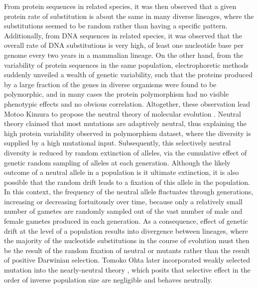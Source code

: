 From protein sequences in related species, it was then observed that a given protein rate of substitution is about the same in many diverse lineages, where the substitutions seemed to be random rather than having a specific pattern.
Additionally, from DNA sequences in related species, it was observed that the overall rate of DNA substitutions is very high, of least one nucleotide base per genome every two years in a mammalian lineage.
On the other hand, from the variability of protein sequences in the same population, electrophoretic methods suddenly unveiled a wealth of genetic variability, such that the proteins produced by a large fraction of the genes in diverse organisms were found to be polymorphic, and in many cases the protein polymorphism had no visible phenotypic effects and no obvious correlation.
Altogether, these observation lead Motoo Kimura to propose the \gls{neutral} theory of molecular evolution \citep{kimura1968evolutionary,kimura1991neutral,kimura1986dna}.
Neutral theory claimed that most mutations are adaptively \gls{neutral}, thus explaining the high protein variability observed in polymorphism dataset, where the diversity is supplied by a high mutational input.
Subsequently, this selectively neutral diversity is reduced by random extinction of alleles, via the cumulative effect of genetic random sampling of alleles at each generation.
Although the likely outcome of a neutral allele in a population is it ultimate extinction, it is also possible that the random drift leads to a fixation of this allele in the population.
In this context, the frequency of the neutral allele fluctuates through generations, increasing or decreasing fortuitously over time, because only a relatively small number of gametes are randomly sampled out of the vast number of male and female gametes produced in each generation.
As a consequence, effect of genetic drift at the level of a population results into divergence between lineages, where the majority of the nucleotide substitutions in the course of evolution must then be the result of the random fixation of neutral or mutants rather than the result of positive Darwinian selection.
Tomoko Ohta later incorporated weakly selected mutation into the \gls{nearly-neutral} theory \citep{ohta1973slightly}, which posits that selective effect in the order of inverse population size are negligible and behaves neutrally.

